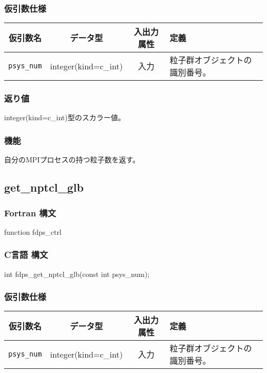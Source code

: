 \subsubsection*{仮引数仕様}
\begin{table}[h]
\begin{tabularx}{\linewidth}{cccX}
\toprule
\rowcolor{Snow2}
仮引数名 & データ型 & 入出力属性 & 定義 \\
\midrule
\texttt{psys\_num} & integer(kind=c\_int) & 入力 & 粒子群オブジェクトの識別番号。\\
\bottomrule
\end{tabularx}
\end{table}

\subsubsection*{返り値}
integer(kind=c\_int)型のスカラー値。

\subsubsection*{機能}
自分のMPIプロセスの持つ粒子数を返す。

\clearpage

\subsection{get\_nptcl\_glb}
\subsubsection*{Fortran 構文}
\begin{screen}
\begin{spverbatim}
function fdps_ctrl%
\end{spverbatim}
\end{screen}

\subsubsection*{C言語 構文}
\begin{screen}
\begin{spverbatim}
int fdps_get_nptcl_glb(const int psys_num);
\end{spverbatim}
\end{screen}

\subsubsection*{仮引数仕様}
\begin{table}[h]
\begin{tabularx}{\linewidth}{cccX}
\toprule
\rowcolor{Snow2}
仮引数名 & データ型 & 入出力属性 & 定義 \\
\midrule
\texttt{psys\_num} & integer(kind=c\_int) & 入力 & 粒子群オブジェクトの識別番号。\\
\bottomrule
\end{tabularx}
\end{table}

